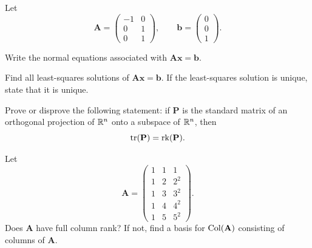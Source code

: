 \documentclass[11pt,oneside]{article}
\begin{document}
\begin{problem}
Let
\[
\mathbf A=
\begin{pmatrix}
-1&0\\
0&1\\
0&1
\end{pmatrix},
\qquad
\mathbf b=
\begin{pmatrix}
0\\0\\1
\end{pmatrix}.
\]
\begin{problemsubparts}
\item Write the normal equations associated with $\mathbf A\mathbf x=\mathbf b$.
\item Find all least-squares solutions of $\mathbf A\mathbf x=\mathbf b$. If the least-squares solution is unique, state that it is unique.
\end{problemsubparts}
\end{problem}

\begin{problem}
Prove or disprove the following statement: if $\mathbf P$ is the standard matrix of an orthogonal projection of $\mathbb{R}^n$ onto a subspace of $\mathbb{R}^n$, then
\[
\operatorname{tr}(\mathbf P)=\operatorname{rk}(\mathbf P).
\]
\end{problem}

\begin{problem}
Let
\[
\mathbf A=
\begin{pmatrix}
1&1&1\\
1&2&2^2\\
1&3&3^2\\
1&4&4^2\\
1&5&5^2
\end{pmatrix}.
\]
Does $\mathbf A$ have full column rank? If not, find a basis for $\operatorname{Col}(\mathbf A)$ consisting of columns of $\mathbf A$.
\end{problem}
\end{document}
